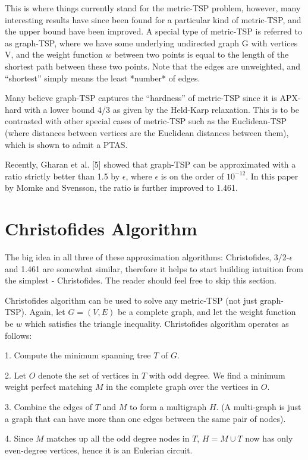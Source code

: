 \documentclass[12pt]{article}
\begin{document}
This is where things currently stand for the metric-TSP problem, however, many interesting results have since been found for a particular kind of metric-TSP, and the upper bound have been improved. A special type of metric-TSP is referred to as graph-TSP, where we have some underlying undirected graph G with vertices V, and the weight function $w$ between two points is equal to the length of the shortest path between these two points. Note that the edges are unweighted, and ``shortest'' simply means the least *number* of edges.

Many believe graph-TSP captures the ``hardness'' of metric-TSP since it is APX-hard with a lower bound 4/3 as given by the Held-Karp relaxation. This is to be contrasted with other special cases of metric-TSP such as the Euclidean-TSP (where distances between vertices are the Euclidean distances between them), which is shown to admit a PTAS.

Recently, Gharan et al. [5] showed that graph-TSP can be approximated with a ratio strictly better than 1.5 by $\epsilon$, where $\epsilon$ is on the order of $10^{-12}$. In this paper by Momke and Svensson, the ratio is further improved to 1.461.

\section{Christofides Algorithm}

The big idea in all three of these approximation algorithms: Christofides, 3/2-$\epsilon$ and 1.461 are somewhat similar, therefore it helps to start building intuition from the simplest - Christofides. The reader should feel free to skip this section.

Christofides algorithm can be used to solve any metric-TSP (not just graph-TSP). Again, let $G=(V,E)$ be a complete graph, and let the weight function be $w$ which satisfies the triangle inequality. Christofides algorithm operates as follows:

1. Compute the minimum spanning tree $T$ of $G$.

2. Let $O$ denote the set of vertices in $T$ with odd degree. We find a minimum weight perfect matching $M$ in the complete graph over the vertices in $O$.

3. Combine the edges of $T$ and $M$ to form a multigraph $H$. (A multi-graph is just a graph that can have more than one edges between the same pair of nodes).

4. Since $M$ matches up all the odd degree nodes in $T$, $H=M\cup T$ now has only even-degree vertices, hence it is an Eulerian circuit.
\end{document}
